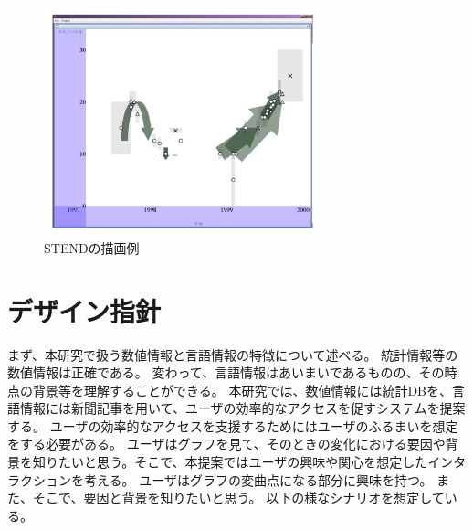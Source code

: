 \documentclass{matsushita-zemi}
\begin{document}
\begin{figure}[tb]
  \begin{center}
   \includegraphics[width=8cm,bb=0 0 512 422]{STEND.PNG}
  \end{center}
 \caption{STENDの描画例}
 \label{STEND}
\end{figure}

\section{デザイン指針}
まず、本研究で扱う数値情報と言語情報の特徴について述べる。
統計情報等の数値情報は正確である。
変わって、言語情報はあいまいであるものの、その時点の背景等を理解することができる。
本研究では、数値情報には統計DBを、言語情報には新聞記事を用いて、ユーザの効率的なアクセスを促すシステムを提案する。
ユーザの効率的なアクセスを支援するためにはユーザのふるまいを想定をする必要がある。
ユーザはグラフを見て、そのときの変化における要因や背景を知りたいと思う。そこで、本提案ではユーザの興味や関心を想定したインタラクションを考える。
ユーザはグラフの変曲点になる部分に興味を持つ。
また、そこで、要因と背景を知りたいと思う。
以下の様なシナリオを想定している。
\end{document}
